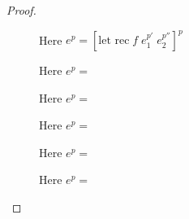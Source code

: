 \documentclass[../../master.tex]{subfiles}
\begin{document}
\begin{proof}
\begin{description}
		\item[] Here $e^p=[\mbox{let rec}\;f\;e_1^{p'}\;e_2^{p''}]^p$

		\item[] Here $e^p=$

		\item[] Here $e^p=$

		\item[] Here $e^p=$

		\item[] Here $e^p=$

		\item[] Here $e^p=$
	\end{description}
\end{proof}
\end{document}
